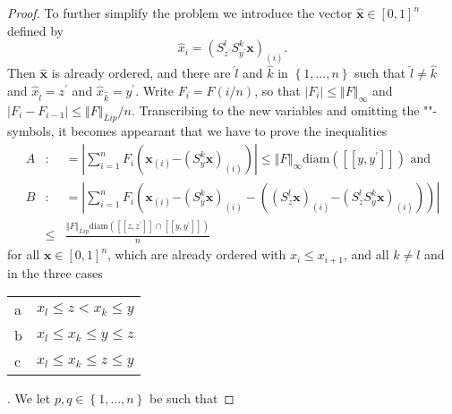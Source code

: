 \documentclass[final,12pt]{colt2018} %
\begin{document}
\begin{proof}
							To further simplify the problem we introduce the vector $\mathbf{\hat{x}}\in %
							\left[ 0,1\right] ^{n}$ defined by 
							\[
							\hat{x}_{i}=\left( S_{z^{\prime }}^{l}S_{y^{\prime }}^{k}\mathbf{x}\right)
							_{\left( i\right) }\text{.}
							\]%
							Then $\mathbf{\hat{x}}$ is already ordered, and there are $\hat{l}$ and $%
							\hat{k}$ in $\left\{ 1,...,n\right\} $ such that $\hat{l}\neq \hat{k}$ and $%
							\hat{x}_{\hat{l}}=z^{\prime }$ and $\hat{x}_{\hat{k}}=y^{\prime }$. Write $%
							F_{i}=F\left( i/n\right) $, so that $\left\vert F_{i}\right\vert \leq
							\left\Vert F\right\Vert _{\infty }$ and $\left\vert F_{i}-F_{i-1}\right\vert
							\leq \left\Vert F\right\Vert _{Lip}/n$. Transcribing to the new variables
							and omitting the ""-symbols, it becomes appearant that we have to
							prove the inequalities%
							\begin{eqnarray*}
								A &:&=\left\vert \sum_{i=1}^{n}F_{i}\left( \mathbf{x}_{\left( i\right) }%
								\mathbf{-}\left( S_{y}^{k}\mathbf{x}\right) _{\left( i\right) }\right)
								\right\vert \leq \left\Vert F\right\Vert _{\infty }\text{diam}\left( \left[ %
								\left[ y,y^{\prime }\right] \right] \right) \text{ and} \\
								B &:&=\left\vert \sum_{i=1}^{n}F_{i}\left( \mathbf{x}_{\left( i\right) }%
								\mathbf{-}\left( S_{y}^{k}\mathbf{x}\right) _{\left( i\right) }-\left(
								\left( S_{z}^{l}\mathbf{x}\right) _{\left( i\right) }\mathbf{-}\left(
								S_{z}^{l}S_{y}^{k}\mathbf{x}\right) _{\left( i\right) }\right) \right)
								\right\vert  \\
								&\leq &\frac{\left\Vert F\right\Vert _{Lip}\text{diam}\left( \left[ \left[
									z,z^{\prime }\right] \right] \cap \left[ \left[ y,y^{\prime }\right] \right]
									\right) }{n}
							\end{eqnarray*}%
							for all $\mathbf{x}\in \left[ 0,1\right] ^{n}$, which are already ordered
							with $x_{i}\leq x_{i+1}$, and all $k\neq l$ and in the three cases\newline
							\begin{tabular}{l|l}
								a & \multicolumn{1}{|l}{$x_{l}\leq z<x_{k}\leq y$} \\ 
								b & \multicolumn{1}{|l}{$x_{l}\leq x_{k}\leq y\leq z$} \\ 
								c & \multicolumn{1}{|l}{$x_{l}\leq x_{k}\leq z\leq y$}%
							\end{tabular}%
							.\newline
							We let $p,q\in \left\{ 1,...,n\right\} $ be such that%

\end{proof}
\end{document}
